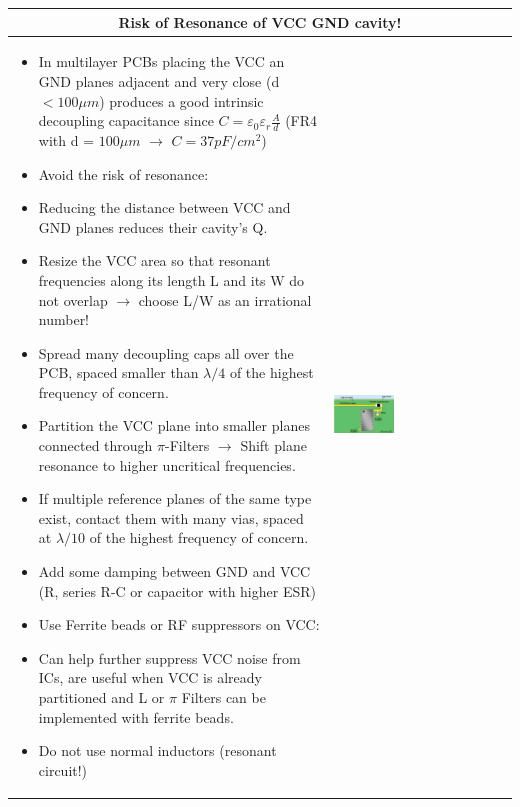 		\begin{table}[h!]
		\centering
		\begin{tabular}{|m{}|m{}|}
				\multicolumn{2}{c}{\textbf{Risk of Resonance of VCC GND cavity!}}
			\\
			\hline
			
				\begin{itemize}
					\item In multilayer PCBs placing the VCC an GND planes adjacent and very close (d  $< 100\mu m$) produces a good intrinsic decoupling capacitance since $C = \varepsilon_0 \varepsilon_r \frac{A}{d}$ (FR4 with d = $100 \mu m$ $\rightarrow$ $C = 37 pF/cm^2$)
					\item Avoid the risk of resonance:
					\setlength{\itemsep}{-4pt}
					\item[] Reducing the distance between VCC and GND planes reduces their cavity's Q. 
					\item[] Resize the VCC area so that resonant frequencies along its length L and its W do not overlap $\rightarrow$ choose L/W as an irrational number! 
					\item[] Spread many decoupling caps all over the PCB, spaced smaller than $\lambda/4$ of the highest frequency of concern. 
					\item[] Partition the VCC plane into smaller planes connected through $\pi$-Filters $\rightarrow$ Shift plane resonance to higher uncritical frequencies. 
					\item[] If multiple reference planes of the same type exist, contact them with many vias, spaced at $\lambda/10$ of the highest frequency of concern. 
					\item[] Add some damping between GND and VCC (R, series R-C or capacitor with higher ESR)
					\setlength{\itemsep}{0pt}
					\item Use Ferrite beads or RF suppressors on VCC: 
					\setlength{\itemsep}{-4pt}
					\item[] Can help further suppress VCC noise from ICs, are useful when VCC is already partitioned and L or $\pi$ Filters can be implemented with ferrite beads. 
					\item[] Do not use normal inductors (resonant circuit!)
				\end{itemize}
			&
					\begin{center}\includegraphics[width=0.35\textwidth]{images/FerriteDecouple1.png}\end{center} 

\end{tabular}
\end{table}
